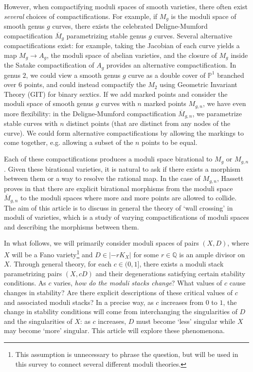 \documentclass[11pt]{amsart}
\numberwithin{equation}{section}
\theoremstyle{definition}
\newcommand{\bQ}{\mathbb{Q}}
\newcommand{\bP}{\mathbb{P}}
\newcommand{\oM}{\overline M}
\begin{document}
However, when compactifying moduli spaces of smooth varieties, there often exist \textit{several} choices of compactifications.  For example, if $M_g$ is the moduli space of smooth genus $g$ curves, there exists the celebrated Deligne-Mumford compactification $\oM_g$ parametrizing stable genus $g$ curves.  Several alternative compactifications exist: for example, taking the Jacobian of each curve yields a map $M_g \to A_g$, the moduli space of abelian varieties, and the closure of $M_g$ inside the Satake compactification of $A_g$ provides an alternative compactification.  In genus $2$, we could view a smooth genus $g$ curve as a double cover of $\bP^1$ branched over $6$ points, and could instead compactify the $M_2$ using Geometric Invariant Theory (GIT) for binary sextics.  If we add marked points and consider the moduli space of smooth genus $g$ curves with $n$ marked points $M_{g,n}$, we have even more flexibility: in the Deligne-Mumford compactification $\oM_{g,n}$, we parametrize stable curves with $n$ distinct points (that are distinct from any nodes of the curve).  We could form alternative compactifications by allowing the markings to come together, e.g. allowing a subset of the $n$ points to be equal. 

Each of these compactifications produces a moduli space birational to $M_g$ or $M_{g,n}$.  Given these birational varieties, it is natural to ask if there exists a morphism between them or a way to resolve the rational map. In the case of $M_{g,n}$, Hassett proves in \cite{Hassettcurves} that there are explicit birational morphisms from the moduli space $\oM_{g,n}$ to the moduli spaces where more and more points are allowed to collide. The aim of this article is to discuss in general the theory of `wall crossing' in moduli of varieties, which is a study of varying compactifications of moduli spaces and describing the morphisms between them. 


In what follows, we will primarily consider moduli spaces of pairs $(X,D)$, where $X$ will be a Fano variety\footnote{This assumption is unnecessary to phrase the question, but will be used in this survey to connect several different moduli theories.} and $D \in |-rK_X|$ for some $r \in \bQ$ is an ample divisor on $X$.  Through general theory, for each $c \in (0,1]$, there exists a moduli stack parametrizing pairs $(X,cD)$ and their degenerations satisfying certain stability conditions.  As $c$ varies, \textit{how do the moduli stacks change}?  What values of $c$ cause changes in stability?  Are there explicit descriptions of these critical values of $c$ and associated moduli stacks?  In a precise way, as $c$ increases from $0$ to $1$, the change in stability conditions will come from interchanging the singularities of $D$ and the singularities of $X$: as $c$ increases, $D$ must become `less' singular while $X$ may become `more' singular.  This article will explore these phenomenona.
\end{document}
